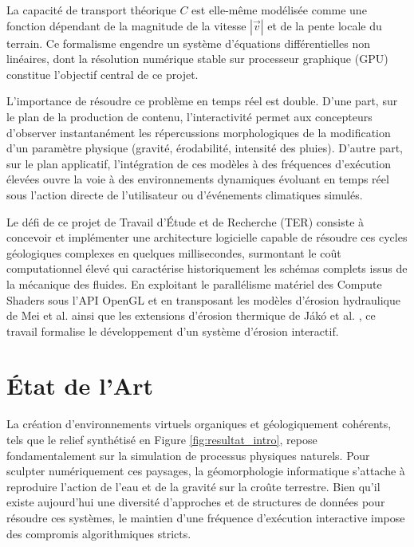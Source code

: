 \documentclass[10pt,twocolumn,a4paper]{article}
\begin{document}
La capacité de transport théorique $C$ est elle-même modélisée comme une fonction dépendant de la magnitude de la vitesse $|\vec{v}|$ et de la pente locale du terrain. Ce formalisme engendre un système d'équations différentielles non linéaires, dont la résolution numérique stable sur processeur graphique (GPU) constitue l'objectif central de ce projet.

L'importance de résoudre ce problème en temps réel est double. D'une part, sur le plan de la production de contenu, l'interactivité permet aux concepteurs d'observer instantanément les répercussions morphologiques de la modification d'un paramètre physique (gravité, érodabilité, intensité des pluies). D'autre part, sur le plan applicatif, l'intégration de ces modèles à des fréquences d'exécution élevées ouvre la voie à des environnements dynamiques évoluant en temps réel sous l'action directe de l'utilisateur ou d'événements climatiques simulés.

Le défi de ce projet de Travail d'Étude et de Recherche (TER) consiste à concevoir et implémenter une architecture logicielle capable de résoudre ces cycles géologiques complexes en quelques millisecondes, surmontant le coût computationnel élevé qui caractérise historiquement les schémas complets issus de la mécanique des fluides. En exploitant le parallélisme matériel des Compute Shaders sous l'API OpenGL et en transposant les modèles d'érosion hydraulique de Mei et al. \cite{MDH07} ainsi que les extensions d'érosion thermique de Jákó et al. \cite{Jako11}, ce travail formalise le développement d'un système d'érosion interactif.

\section{État de l'Art}\label{sec:etat_art}

La création d'environnements virtuels organiques et géologiquement cohérents, tels que le relief synthétisé en Figure \ref{fig:resultat_intro}, repose fondamentalement sur la simulation de processus physiques naturels. Pour sculpter numériquement ces paysages, la géomorphologie informatique s'attache à reproduire l'action de l'eau et de la gravité sur la croûte terrestre. Bien qu'il existe aujourd'hui une diversité d'approches et de structures de données pour résoudre ces systèmes, le maintien d'une fréquence d'exécution interactive impose des compromis algorithmiques stricts.
\end{document}
